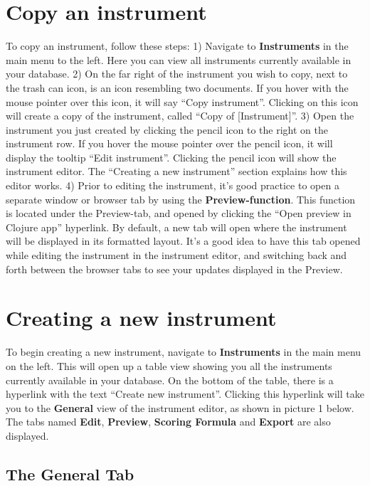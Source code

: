 \documentclass[]{book}
\begin{document}
\hypertarget{copy-an-instrument}{%
\section{Copy an instrument}\label{copy-an-instrument}}

To copy an instrument, follow these steps:
1) Navigate to \textbf{Instruments} in the main menu to the left. Here you can view all instruments currently available in your database.
2) On the far right of the instrument you wish to copy, next to the trash can icon, is an icon resembling two documents. If you hover with the mouse pointer over this icon, it will say ``Copy instrument''. Clicking on this icon will create a copy of the instrument, called ``Copy of {[}Instrument{]}''.
3) Open the instrument you just created by clicking the pencil icon to the right on the instrument row. If you hover the mouse pointer over the pencil icon, it will display the tooltip ``Edit instrument''. Clicking the pencil icon will show the instrument editor. The ``Creating a new instrument'' section explains how this editor works.
4) Prior to editing the instrument, it's good practice to open a separate window or browser tab by using the \textbf{Preview-function}. This function is located under the Preview-tab, and opened by clicking the ``Open preview in Clojure app'' hyperlink. By default, a new tab will open where the instrument will be displayed in its formatted layout. It's a good idea to have this tab opened while editing the instrument in the instrument editor, and switching back and forth between the browser tabs to see your updates displayed in the Preview.

\hypertarget{creating-a-new-instrument}{%
\section{Creating a new instrument}\label{creating-a-new-instrument}}

To begin creating a new instrument, navigate to \textbf{Instruments} in the main menu on the left. This will open up a table view showing you all the instruments currently available in your database. On the bottom of the table, there is a hyperlink with the text ``Create new instrument''. Clicking this hyperlink will take you to the \textbf{General} view of the instrument editor, as shown in picture 1 below. The tabs named \textbf{Edit}, \textbf{Preview}, \textbf{Scoring Formula} and \textbf{Export} are also displayed.

\hypertarget{the-general-tab}{%
\subsection{The General Tab}\label{the-general-tab}}
\end{document}
